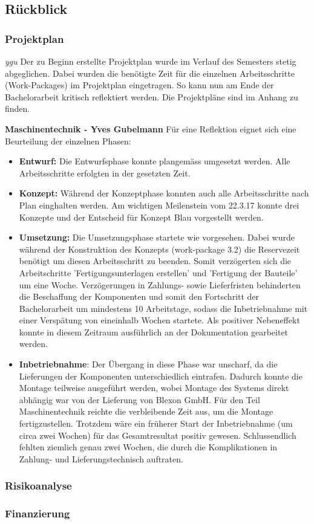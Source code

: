 \subsection{Rückblick}
\newpage
\subsubsection{Projektplan}
\label{projektplan}
\textit{ygu} Der zu Beginn erstellte Projektplan wurde im Verlauf des Semesters stetig abgeglichen. Dabei wurden die benötigte Zeit für die einzelnen Arbeitsschritte (Work-Packages) im Projektplan eingetragen. So kann nun am Ende der Bachelorarbeit kritisch reflektiert werden. Die Projektpläne sind im Anhang zu finden.
\newline

\textbf{Maschinentechnik - Yves Gubelmann}
\newline
Für eine  Reflektion eignet sich eine Beurteilung der einzelnen Phasen:
\begin{itemize}
	\item \textbf{Entwurf:} Die Entwurfsphase konnte plangemäss umgesetzt werden. Alle Arbeitsschritte erfolgten in der gesetzten Zeit.
	
	\item \textbf{Konzept:} Während der Konzeptphase konnten auch alle Arbeitsschritte nach Plan einghalten werden. Am wichtigen Meilenstein vom 22.3.17 konnte drei Konzepte und der Entscheid für Konzept Blau vorgestellt werden.
	
	\item \textbf{Umsetzung:} Die Umsetzungsphase startete wie vorgesehen. Dabei wurde während der Konstruktion des Konzepts (work-package 3.2) die Reservezeit benötigt um diesen Arbeitsschritt zu beenden. Somit verzögerten sich die Arbeitschritte 'Fertigungsunterlagen erstellen' und 'Fertigung der Bauteile' um eine Woche. Verzögerungen in Zahlungs- sowie Lieferfristen behinderten die Beschaffung der Komponenten und somit den Fortschritt der Bachelorarbeit um mindestens 10 Arbeitstage, sodass die Inbetriebnahme mit einer Verspätung von eineinhalb Wochen startete. Als positiver Nebeneffekt konnte in diesem Zeitraum ausführlich an der Dokumentation gearbeitet werden.
	
	\item \textbf{Inbetriebnahme}: Der Übergang in diese Phase war unscharf, da die Lieferungen der Komponenten unterschiedlich eintrafen. Dadurch konnte die Montage teilweise ausgeführt werden, wobei Montage des Systems direkt abhängig war von der Lieferung von Blexon GmbH. Für den Teil Maschinentechnik reichte die verbleibende Zeit aus, um die Montage fertigzustellen. Trotzdem wäre ein früherer Start der Inbetriebnahme (um circa zwei Wochen) für das Gesamtresultat positiv gewesen. Schlussendlich fehlten ziemlich genau zwei Wochen, die durch die Komplikationen in Zahlung- und Lieferungstechnisch auftraten.

	
\end{itemize} 

\subsubsection{Risikoanalyse}

\subsubsection{Finanzierung}
\label{finanzierung}